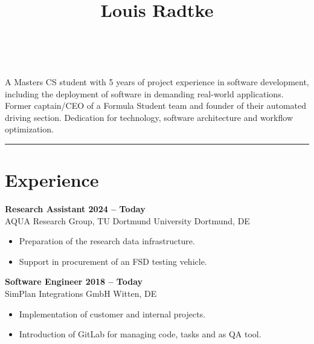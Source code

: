 \documentclass[a4paper,11pt]{article}
\newcommand{\subsectionskip}[0]{\vspace{0.125cm}}
\newcommand{\col}[2]{\textcolor[HTML]{#1}{#2}}
\begin{document}
\hfill
\begin{minipage}[t]{0.65\textwidth}
    \vspace{0cm} %
    \begin{center}
        \title*{\Huge \textbf{Louis Radtke}}\\
    \end{center}

    \vspace{0.125cm}

    {
        \small A Masters CS student with 5 years of project experience in software development, including the deployment of software in demanding real-world applications. Former captain/CEO of a Formula Student team and founder of their automated driving section. Dedication for technology, software architecture and workflow optimization.
    }


    \vspace{0.25cm}
    \hrule

    \section*{\col{b1784a}{Experience}}
    \col{b57e53}{\textbf{Research Assistant \hfill 2024 -- Today}}\\
    AQUA Research Group, TU Dortmund University \hfill Dortmund, DE
    \begin{itemize}
        \small
        \item Preparation of the research data infrastructure.
        \item Support in procurement of an FSD testing vehicle.
    \end{itemize}

    \subsectionskip

    \col{ae7c58}{\textbf{Software Engineer \hfill 2018 -- Today}} \\
    SimPlan Integrations GmbH \hfill Witten, DE
    \begin{itemize}
        \small
        \item Implementation of customer and internal projects.
        \item Introduction of GitLab for managing code, tasks and as QA tool.
    \end{itemize}


\end{minipage}
\end{document}
